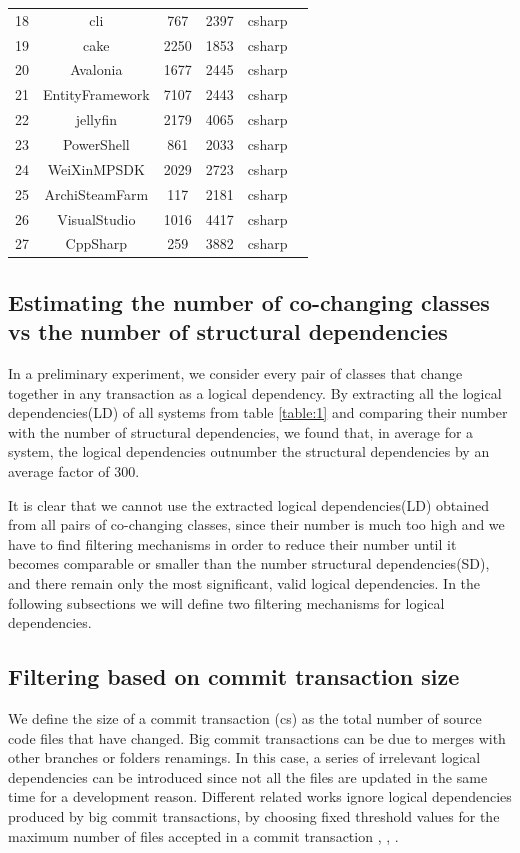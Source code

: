 \documentclass[conference]{IEEEtran}
\begin{document}
\begin{table}[!h]
\begin{tabular}{|c|c|c|c|c|c|}
18	&	cli	&	767	&	2397	&	csharp	\\
19	&	cake	&	2250	&	1853	&	csharp	\\
20	&	Avalonia	&	1677	&	2445	&	csharp	\\
21	&	EntityFramework	&	7107	&	2443	&	csharp	\\
22	&	jellyfin	&	2179	&	4065	&	csharp	\\
23	&	PowerShell	&	861	&	2033	&	csharp	\\
24	&	WeiXinMPSDK	&	2029	&	2723	&	csharp	\\
25	&	ArchiSteamFarm	&	117	&	2181	&	csharp	\\
26	&	VisualStudio	&	1016	&	4417	&	csharp	\\
27	&	CppSharp	&	259	&	3882	&	csharp	\\
\hline
\end{tabular}
\end{table}

\subsection{Estimating the number of co-changing classes vs the number of structural dependencies}
\label{sec:preliminary}

In a preliminary experiment, we consider every pair of classes that change together in any transaction  as a logical dependency. By extracting all the logical dependencies(LD) of all systems from table \ref{table:1} and comparing  their number with the number of structural dependencies,  we found that, in average for a system,  the logical dependencies outnumber the structural dependencies by an average factor of 300.  

It is clear that we cannot use the extracted logical dependencies(LD) obtained from all pairs of co-changing classes, since their number is much too high and we have to find filtering mechanisms in order to reduce their number until it becomes comparable or smaller than the number structural dependencies(SD), and there remain only the most significant, valid logical dependencies.
In the following subsections we will define two filtering mechanisms for logical dependencies.

\subsection{Filtering based on commit transaction size}

We define the size of a commit transaction (cs) as the total number of source code files that have changed. Big commit transactions can be due to merges with other branches or folders renamings. In this case, a series of irrelevant logical dependencies can be introduced since not all the files are updated in the same time for a development reason. Different related works ignore logical dependencies produced by big commit transactions, by choosing fixed threshold values for the maximum number of files accepted in a commit transaction \cite{DBLP:journals/jss/AjienkaC17}, \cite{DBLP:journals/ese/AjienkaCC18}, \cite{Beck:2011:CMC:2025113.2025162}.
\end{document}
